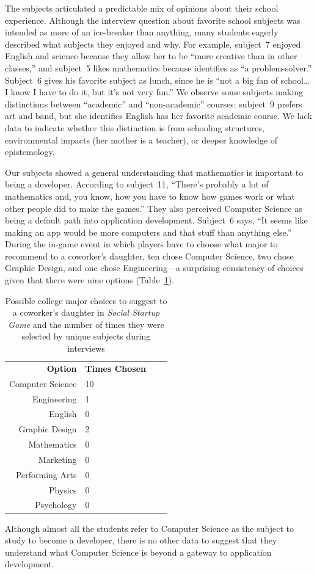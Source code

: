\documentclass[letterpaper]{article}
\begin{document}
The subjects articulated a predictable mix of opinions about their
school experience. Although the interview question about favorite
school subjects was intended as more of an ice-breaker than anything,
many students eagerly described what subjects they enjoyed and why.
For example, subject~7 enjoyed English and science because they allow her
to be ``more creative than in other classes,'' and subject~5 likes
mathematics because identifies as ``a problem-solver.''
Subject~6 gives his favorite subject as lunch, since he is ``not a big
fan of school\ldots{} I know I have to do it, but it's not very fun.''
We observe some subjects making distinctions between ``academic'' and 
``non-academic'' courses: subject~9 prefers art and band, but she identifies
English has her favorite academic course. We lack data to indicate whether
this distinction is from schooling structures, environmental impacts (her
mother is a teacher), or deeper knowledge of epistemology.

Our subjects showed a general understanding that mathematics is important
to being a developer. According to subject~11, 
``There's probably a lot of mathematics and, you know, how you have to
know how games work or what other people did to make the games.''
% 
They also perceived Computer Science as being a default path into
application development.  Subject~6 says, ``It seems like making an
app would be more computers and that stuff than anything else.''
During the in-game event in which players have to choose what major to recommend
to a coworker's daughter, ten chose Computer Science, two chose 
Graphic Design, and one chose Engineering---a surprising consistency
of choices given that there were nine options (Table~\ref{tab:child-advice}).
%
\begin{table}
\begin{framed}
\centering
\begin{tabular}{rlrl}
\textbf{Option} & \textbf{Times Chosen}\\
Computer Science & 10\\
Engineering & 1\\
English & 0\\
Graphic Design & 2\\
Mathematics & 0\\
Marketing & 0\\
Performing Arts & 0\\
Physics & 0\\
Psychology & 0
\end{tabular}
\caption{Possible college major choices to suggest to a coworker's daughter 
 in \textit{Social Startup Game} and the number of times they were
 selected by unique subjects during interviews}
\label{tab:child-advice}
\end{framed}
\end{table}
%
Although almost all the students refer to Computer Science as the
subject to study to become a developer, there is no other data
to suggest that they understand what Computer Science is beyond a gateway
to application development.
\end{document}
